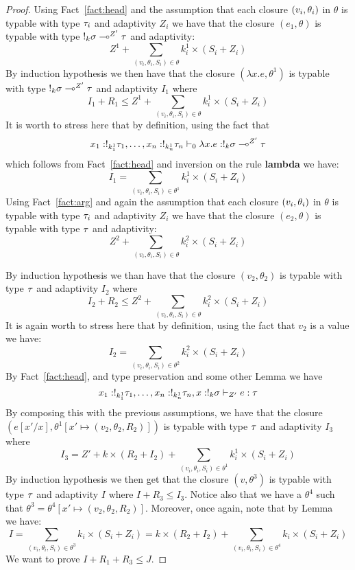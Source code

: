 \begin{proof}
Using  Fact~\ref{fact:head} and the assumption
that each closure $ (v_i, \theta_i) $ in $\theta$ is typable with
type $\tau_i$ and adaptivity $Z_i$ we have that the closure
$(e_1,\theta)$ is typable with type $!_{k} \sigma
      \multimap^{Z'} \tau$ and adaptivity:
$$
Z^1+\sum_{(v_i,\theta_i,S_i)\in\theta}k_i^1\times(S_i+Z_i)
$$
By induction hypothesis we then have that the closure 
$(\lambda x. e,\theta^1)$ is typable with type $!_{k} \sigma
      \multimap^{Z'} \tau$ and adaptivity $I_1$ where 
$$I_1+R_1\leq Z^1+\sum_{(v_i,\theta_i,S_i)\in\theta }k_i^1\times(S_i+Z_i)$$
It is worth to stress here that by definition, using the fact that 
$$
 x_1 : !_{k_1^1} \tau_1, \ldots, x_n:!_{k_n^1} \tau_n
       \vdash_{0} \lambda x. e : !_{k} \sigma
      \multimap^{Z'} \tau
$$
which follows from Fact~\ref{fact:head} and inversion on the rule {\bf
  lambda}  we have:
$$
I_1=\sum_{(v_i,\theta_i,S_i)\in\theta^1}k_i^1\times(S_i+Z_i)
$$
%
Using  Fact~\ref{fact:arg} and again the assumption
that each closure $ (v_i, \theta_i) $ in $\theta$ is typable with
type $\tau_i$ and adaptivity $Z_i$ we have that the closure
$(e_2,\theta)$ is typable with type $\tau$ and adaptivity:
$$
Z^2+\sum_{(v_i,\theta_i,S_i)\in\theta}k_i^2\times(S_i+Z_i)
$$

By induction hypothesis we than have that the closure 
$(v_2,\theta_2)$ is typable with type $\tau$ and adaptivity $I_2$ where 
$$I_2+R_2\leq Z^2+\sum_{(v_i,\theta_i,S_i)\in\theta}k_i^2\times(S_i+Z_i)$$
%
It is again worth to stress here that by definition, using the fact
that $v_2$ is a value we have:
$$
I_2=\sum_{(v_i,\theta_i,S_i)\in\theta^2}k_i^2\times(S_i+Z_i)
$$
By Fact~\ref{fact:head}, and type preservation and some other Lemma
 we have 
\begin{equation}
\label{fact:reduct}
 x_1 : !_{k_1^1} \tau_1, \ldots, x_n:!_{k_n^1} \tau_n,
       x: !_{k} \sigma\vdash_{{Z'}} e : 
       \tau
\end{equation}
By composing this with the previous assumptions, we have that the closure 
$(e[x'/x],\theta^1[x'\mapsto (v_2,\theta_2,R_2)])$ is typable with
type $\tau$ and adaptivity $I_3$ where 
$$I_3=Z'+k\times(R_2+I_2)+\sum_{(v_i,\theta_i,S_i)\in\theta^1}k_i^1\times(S_i+Z_i)$$
By induction hypothesis we then get that the closure $(v,\theta^3)$ is
typable with type $\tau$ and adaptivity $I$ where $I+R_3\leq
I_3$. Notice also that we have a $\theta^4$ such that
$\theta^3=\theta^4[x' \mapsto (v_2,\theta_2,R_2) ]$.
Moreover, once again, note that by Lemma~ we have:
$$
I=\sum_{(v_i,\theta_i,S_i)\in\theta^3}k_i\times(S_i+Z_i)= k\times(R_2+I_2)+\sum_{(v_i,\theta_i,S_i)\in\theta^4}k_i\times(S_i+Z_i)
$$
We want to prove $I+R_1+R_3\leq J$.  


\end{proof}
